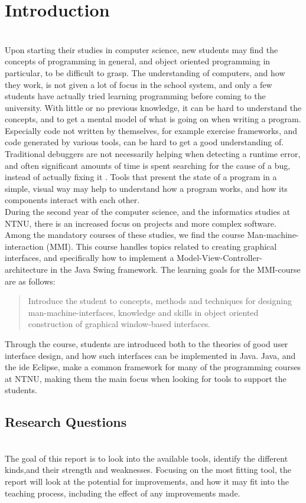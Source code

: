 \section{Introduction}\label{introduction}
~\\
Upon starting their studies in computer science, new students may find the concepts of programming in general, and object oriented programming in particular, to be difficult to grasp.
The understanding of computers, and how they work, is not given a lot of focus in the school system, and only a few students have actually tried learning programming before coming to the university.
With little or no previous knowledge, it can be hard to understand the concepts, and to get a mental model of what is going on when writing a program.
Especially code not written by themselves, for example exercise frameworks, and code generated by various tools, can be hard to get a good understanding of.
Traditional debuggers are not necessarily helping when detecting a runtime error, and often significant amounts of time is spent searching for the cause of a bug, instead of actually fixing it \cite{ko2006}.
Tools that present the state of a program in a simple, visual way may help to understand how a program works, and how its components interact with each other.
~\\

During the second year of the computer science, and the informatics studies at NTNU, there is an increased focus on projects and more complex software.
Among the mandatory courses of these studies, we find the course Man-machine-interaction (MMI).
This course handles topics related to creating graphical interfaces, and specifically how to implement a Model-View-Controller-architecture in the Java Swing framework.
The learning goals for the MMI-course are as follows:
\begin{quotation}
Introduce the student to concepts, methods and techniques for designing man-machine-interfaces, knowledge and skills in object oriented construction of graphical window-based interfaces.
\end{quotation}
Through the course, students are introduced both to the theories of good user interface design, and how such interfaces can be implemented in Java.
Java, and the \gls{ide} Eclipse, make a common framework for many of the programming courses at NTNU, making them the main focus when looking for tools to support the students.
~\\

\subsection{Research Questions}\label{intro-RQs}
~\\
The goal of this report is to look into the available tools, identify the different kinds,and their strength and weaknesses.
Focusing on the most fitting tool, the report will look at the potential for improvements, and how it may fit into the teaching process, including the effect of any improvements made.

